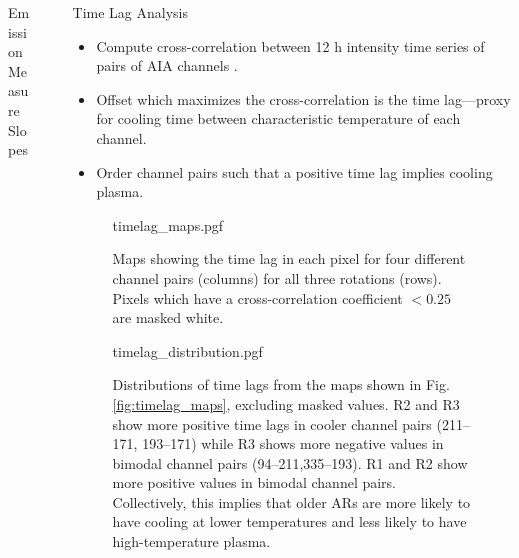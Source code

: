 \documentclass[final]{beamer}
\newlength{\sepwidth}
\newlength{\colwidth}
\newcommand{\separatorcolumn}{\begin{column}{\sepwidth}\end{column}}
\begin{document}
\begin{frame}[t]
\begin{columns}[t]
\begin{column}{\colwidth}
\begin{block}{Emission Measure Slopes}
  \end{block}

\end{column}

\separatorcolumn

\begin{column}{\colwidth}

  \begin{block}{Time Lag Analysis}

    \begin{itemize}
      \item Compute cross-correlation between 12 h intensity time series of pairs of AIA channels \citep{viall_evidence_2012}.
      \item Offset which maximizes the cross-correlation is the \alert{time lag---proxy for cooling time between characteristic temperature of each channel}.
      \item Order channel pairs such that a \alert{positive time lag implies cooling plasma}.
    \end{itemize}

    \vspace{-20pt}

    \begin{figure}
      \centering
      {timelag_maps.pgf}
      \caption{Maps showing the time lag in each pixel for four different channel pairs (columns) for all three rotations (rows). Pixels which have a cross-correlation coefficient $<0.25$ are masked white.}
      \label{fig:timelag_maps}
    \end{figure}

    \vspace{-35pt}

    \begin{figure}
      \centering
      {timelag_distribution.pgf}
      \caption{Distributions of time lags from the maps shown in Fig. \autoref{fig:timelag_maps}, excluding masked values. \textcolor{C1}{R2} and \textcolor{C2}{R3} show more positive time lags in cooler channel pairs (211--171, 193--171) while \textcolor{C2}{R3} shows more negative values in bimodal channel pairs (94--211,335--193). \textcolor{C0}{R1} and \textcolor{C1}{R2} show more positive values in bimodal channel pairs. Collectively, this implies that \alert{older ARs are more likely to have cooling at lower temperatures and less likely to have high-temperature plasma.}}
      \label{fig:timelag_distribution}
    \end{figure}


\end{block}
\end{column}
\end{columns}
\end{frame}
\end{document}
